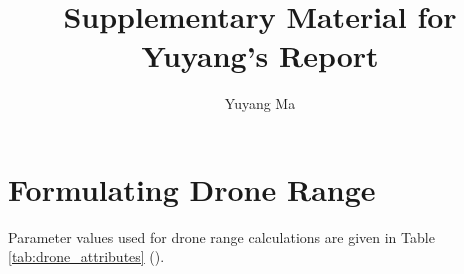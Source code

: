 \documentclass[preprint,review,11pt,authoryear]{elsarticle}
\begin{document}
\begin{frontmatter}

\title{Supplementary Material for Yuyang's Report}


\author[mymainaddress1]{Yuyang Ma}
\address[mymainaddress1]{Department of Industrial and Systems Engineering, Lehigh University, Bethlehem, PA,  USA}
\end{frontmatter}

\appendix
\section{Formulating Drone Range} \label{app:drone_range}
Parameter values used for drone range calculations are given in Table \ref{tab:drone_attributes} (\cite{dukkanci2021minimizing}).
\end{document}
